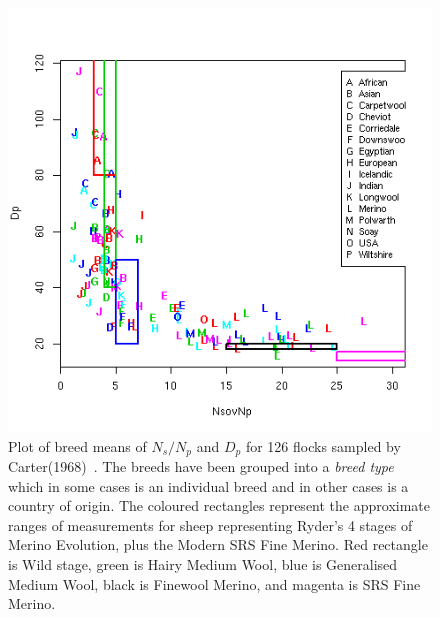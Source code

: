 %

\begin{figure}[!h]
  \centering
   \includegraphics[width=1.0\textwidth]{NsovNpDpa.png}
  \caption{Plot of breed means of $N_{s}/N_{p}$ and $D_{p}$ for 126 flocks sampled by Carter(1968)~\cite{cart:68}. The breeds have been grouped into a {\em breed type} which in some cases is an individual breed and in other cases is a country of origin. The coloured rectangles represent the approximate ranges of measurements for sheep representing Ryder's 4 stages of Merino Evolution, plus the Modern SRS Fine Merino. Red rectangle is Wild stage, green is Hairy Medium Wool, blue is Generalised Medium Wool, black is Finewool Merino, and magenta is SRS Fine Merino.}
  \label{fig:NsovNpDpa}
\end{figure}

%

